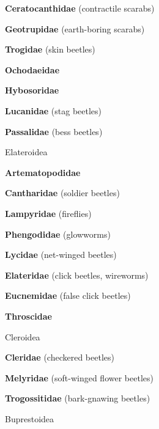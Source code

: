 \documentclass[letterpaper,10pt]{article}
\begin{document}
{%
\makebox[0.6cm]{}  \textbf{Ceratocanthidae} (contractile scarabs) \par
\makebox[0.6cm]{}  \textbf{Geotrupidae} (earth-boring scarabs) \par
\makebox[0.6cm]{}  \textbf{Trogidae} (skin beetles) \par
\makebox[0.6cm]{}  \textbf{Ochodaeidae} \par
\makebox[0.6cm]{}  \textbf{Hybosoridae} \par
\makebox[0.6cm]{}  \textbf{Lucanidae} (stag beetles) \par
\makebox[0.6cm]{}  \textbf{Passalidae} (bess beetles) \par
\makebox[0.40cm]{}  Elateroidea \par
\makebox[0.6cm]{}  \textbf{Artematopodidae} \par
\makebox[0.6cm]{}  \textbf{Cantharidae} (soldier beetles) \par
\makebox[0.6cm]{}  \textbf{Lampyridae} (fireflies) \par
\makebox[0.6cm]{}  \textbf{Phengodidae} (glowworms) \par
\makebox[0.6cm]{}  \textbf{Lycidae} (net-winged beetles) \par
\makebox[0.6cm]{}  \textbf{Elateridae} (click beetles, wireworms) \par
\makebox[0.6cm]{}  \textbf{Eucnemidae} (false click beetles) \par
\makebox[0.6cm]{}  \textbf{Throscidae} \par
\makebox[0.40cm]{}  Cleroidea \par
\makebox[0.6cm]{}  \textbf{Cleridae} (checkered beetles) \par
\makebox[0.6cm]{}  \textbf{Melyridae} (soft-winged flower beetles) \par
\makebox[0.6cm]{}  \textbf{Trogossitidae} (bark-gnawing beetles) \par
\makebox[0.40cm]{}  Buprestoidea \par
}
\end{document}
